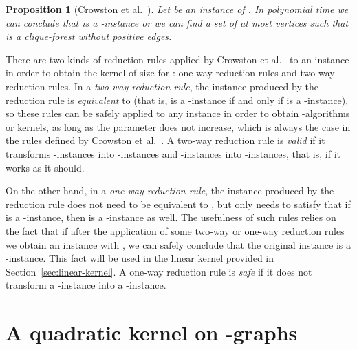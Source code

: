 \documentclass[
final
]{dmtcs-episciences}
\newtheorem{proposition}{Proposition}{\bfseries}{\itshape}
\begin{document}
\begin{proposition}[Crowston et al.~\cite{crowston2013maximum}]
\label{coro4.1}\label{coroker}
Let  be an instance of {}. In polynomial time we can conclude that  is a {}-instance or we can find a set  of at most  vertices such that  is a clique-forest without positive edges.
\end{proposition}



	There are two kinds of reduction rules applied by Crowston et al.~\cite{crowston2013maximum} to an instance  in order to obtain the kernel of size  for {}: one-way reduction rules and two-way reduction rules. In a \emph{two-way reduction rule}, the instance  produced by the reduction rule is {\sl equivalent} to  (that is,  is a {}-instance if and only if
 is a {}-instance), so these rules can be safely applied to any instance in order to obtain {}-algorithms or kernels, as long as the parameter  does not increase, which is always the case in the rules defined by Crowston et al.~\cite{crowston2013maximum}. A two-way reduction rule is {\it{valid}} if it transforms {}-instances into {}-instances and {}-instances into {}-instances, that is, if it works as it should.


 On the other hand, in a \emph{one-way reduction rule}, the instance  produced by the reduction rule does not need to be equivalent to , but only needs to satisfy that if  is a {}-instance, then  is a {}-instance as well. The usefulness of such rules relies on the fact that if after the application of some two-way or one-way reduction rules we obtain an instance  with , we can safely conclude that the original instance  is a {}-instance. This fact will be used in the linear kernel provided in Section~\ref{sec:linear-kernel}. A one-way reduction rule is {\it{safe}} if it does not transform a {}-instance into a {}-instance.











\section{A quadratic kernel on -graphs}
\label{sec:quadratic-kernel}
\end{document}
